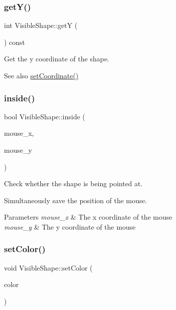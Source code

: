 \subsubsection{\texorpdfstring{get\+Y()}{getY()}}
{\footnotesize\ttfamily int Visible\+Shape\+::getY (\begin{DoxyParamCaption}{ }\end{DoxyParamCaption}) const\hspace{0.3cm}{\ttfamily [virtual]}}



Get the y coordinate of the shape. 

\begin{DoxySeeAlso}{See also}
\mbox{\hyperlink{class_visible_shape_a350f7faac22e405df7c4012fe9d03fac}{set\+Coordinate()}} 
\end{DoxySeeAlso}
\mbox{\label{class_visible_shape_aab5199578030849314f0c6a339aa4281}} 
\subsubsection{\texorpdfstring{inside()}{inside()}}
{\footnotesize\ttfamily bool Visible\+Shape\+::inside (\begin{DoxyParamCaption}\item[{const int \&}]{mouse\+\_\+x,  }\item[{const int \&}]{mouse\+\_\+y }\end{DoxyParamCaption})\hspace{0.3cm}{\ttfamily [virtual]}}



Check whether the shape is being pointed at. 

Simultaneously save the position of the mouse. 
\begin{DoxyParams}{Parameters}
{\em mouse\+\_\+x} & The x coordinate of the mouse \\
\hline
{\em mouse\+\_\+y} & The y coordinate of the mouse \\
\hline
\end{DoxyParams}
\mbox{\label{class_visible_shape_a69ae0940d090fec376bee8dc6861b8dc}} 
\subsubsection{\texorpdfstring{set\+Color()}{setColor()}}
{\footnotesize\ttfamily void Visible\+Shape\+::set\+Color (\begin{DoxyParamCaption}\item[{const \mbox{\hyperlink{class_r_g_b_color}{R\+G\+B\+Color}} \&}]{color }\end{DoxyParamCaption})\hspace{0.3cm}{\ttfamily [virtual]}}




